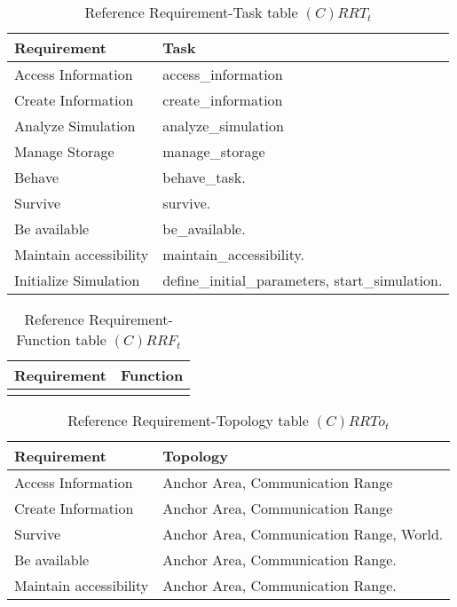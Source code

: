 \begin{table}[H]
	\centering
	\begin{tabular}{|p{4cm}|p{8cm}|}
			\hline
			\textbf{Requirement} & \textbf{Task} \\
			\hline
			Access Information & access\_information \\
			\hline
			Create Information & create\_information \\
			\hline
			Analyze Simulation & analyze\_simulation \\
			\hline
			Manage Storage & manage\_storage \\
			\hline
			Behave & behave\_task. \\
			\hline
			Survive & survive. \\
			\hline
			Be available & be\_available. \\
			\hline
			Maintain accessibility & maintain\_accessibility. \\
			\hline
			Initialize Simulation & define\_initial\_parameters, start\_simulation. \\
			\hline
		\end{tabular}
	\caption{Reference Requirement-Task table $(C)RRT_t$}
	\label{tab:crrtt}
\end{table}

\begin{table}[H]
	\centering
	\begin{tabular}{|p{4cm}|p{8cm}|}
			\hline
			\textbf{Requirement} & \textbf{Function} \\
			\hline
			& \\
			\hline
		\end{tabular}
	\caption{Reference Requirement-Function table $(C)RRF_t$}
	\label{tab:crrft}
\end{table}

\begin{table}[H]
	\centering
	\begin{tabular}{|p{4cm}|p{8cm}|}
			\hline
			\textbf{Requirement} & \textbf{Topology} \\
			\hline
			Access Information & Anchor Area, Communication Range \\
			\hline
			Create Information & Anchor Area, Communication Range \\
			\hline
			Survive & Anchor Area, Communication Range, World. \\
			\hline
			Be available & Anchor Area, Communication Range. \\
			\hline
			Maintain accessibility & Anchor Area, Communication Range. \\
			\hline
		\end{tabular}
	\caption{Reference Requirement-Topology table $(C)RRTo_t$}
	\label{tab:crrtot}
\end{table}


